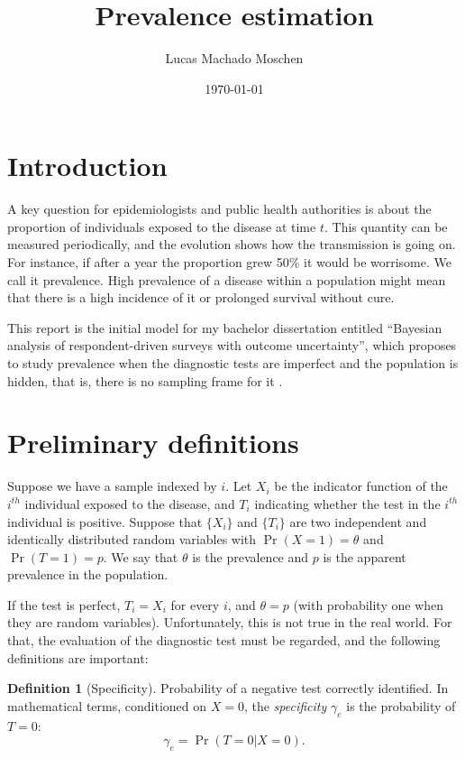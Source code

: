\documentclass[a4paper, notitlepage, 11pt]{article}
\title{Prevalence estimation}
\author{Lucas Machado Moschen}
\affil{School of Applied Mathematics, \\ Fundação Getulio Vargas}
\date{\today}
\theoremstyle{definition}
\newtheorem{definition}{Definition}[section]
\theoremstyle{remark}
\begin{document}
\maketitle

\section{Introduction}

A key question for epidemiologists and public health authorities is about the
proportion of individuals exposed to the disease at time $t$. This quantity
can be measured periodically, and the evolution shows how the transmission is
going on. For instance, if after a year the proportion grew 50\% it would be
worrisome. We call it prevalence. High prevalence of a disease within a
population might mean that there is a high incidence of it or prolonged
survival without cure. 

This report is the initial model for my bachelor dissertation entitled ``Bayesian analysis of respondent-driven surveys with
outcome uncertainty'', which proposes to study prevalence when the diagnostic
tests are imperfect and the population is hidden, that is, there is no
sampling frame for it \cite{heckathorn1997}. 

\section{Preliminary definitions}

Suppose we have a sample indexed by $i$. Let $X_i$ be the indicator
function of the $i^{th}$ individual exposed to the disease, and $T_i$ indicating whether the test in the $i^{th}$ individual is positive. Suppose that
$\{X_i\}$ and $\{T_i\}$ are two independent and identically distributed
random variables with $\Pr(X = 1) = \theta$ and $\Pr(T = 1) = p$. We say that
$\theta$ is the prevalence and $p$ is the apparent prevalence in the
population. 

If the test is perfect, $T_i = X_i$ for every $i$, and
$\theta = p$ (with probability one when they are random variables).
Unfortunately, this is not true in the real world. For that, the evaluation of
the diagnostic test must be regarded, and the following definitions are
important:

\begin{definition}[Specificity]
  Probability of a negative test correctly identified. In mathematical terms,
  conditioned on $X = 0$, the {\em specificity} $\gamma_e$ is the probability of $T = 0$: 
  \begin{equation}
    \gamma_e = \Pr(T = 0|X = 0). 
  \end{equation} 
\end{definition}
\end{document}
